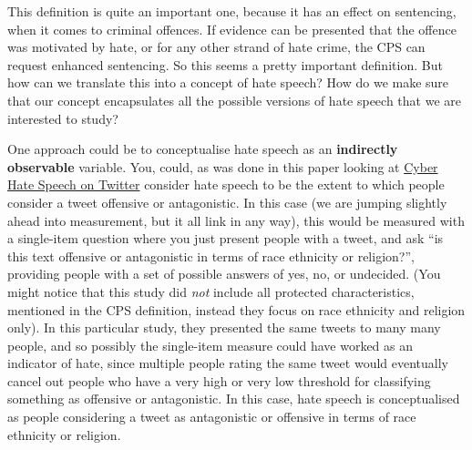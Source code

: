 \documentclass[]{book}
\theoremstyle{definition}
\theoremstyle{definition}
\theoremstyle{definition}
\theoremstyle{remark}
\begin{document}
This definition is quite an important one, because it has an effect on
sentencing, when it comes to criminal offences. If evidence can be
presented that the offence was motivated by hate, or for any other
strand of hate crime, the CPS can request enhanced sentencing. So this
seems a pretty important definition. But how can we translate this into
a concept of hate speech? How do we make sure that our concept
encapsulates all the possible versions of hate speech that we are
interested to study?

One approach could be to conceptualise hate speech as an
\textbf{indirectly observable} variable. You, could, as was done in this
paper looking at
\href{http://onlinelibrary.wiley.com/doi/10.1002/poi3.85/full}{Cyber
Hate Speech on Twitter} consider hate speech to be the extent to which
people consider a tweet offensive or antagonistic. In this case (we are
jumping slightly ahead into measurement, but it all link in any way),
this would be measured with a single-item question where you just
present people with a tweet, and ask ``is this text offensive or
antagonistic in terms of race ethnicity or religion?'', providing people
with a set of possible answers of yes, no, or undecided. (You might
notice that this study did \emph{not} include all protected
characteristics, mentioned in the CPS definition, instead they focus on
race ethnicity and religion only). In this particular study, they
presented the same tweets to many many people, and so possibly the
single-item measure could have worked as an indicator of hate, since
multiple people rating the same tweet would eventually cancel out people
who have a very high or very low threshold for classifying something as
offensive or antagonistic. In this case, hate speech is conceptualised
as people considering a tweet as antagonistic or offensive in terms of
race ethnicity or religion.
\end{document}

